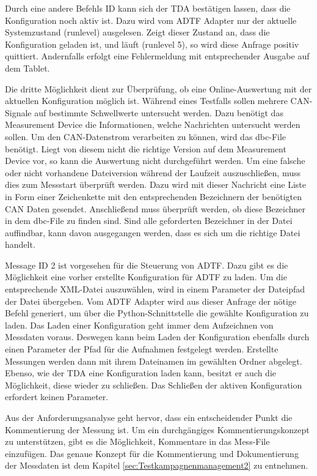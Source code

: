 \documentclass[12pt,a4paper]{report}
\begin{document}
Durch eine andere Befehls ID kann sich der TDA bestätigen lassen, dass die Konfiguration noch aktiv ist. Dazu wird vom ADTF Adapter nur der aktuelle Systemzustand (runlevel) ausgelesen. Zeigt dieser Zustand an, dass die Konfiguration geladen ist, und läuft (runlevel 5), so wird diese Anfrage positiv quittiert. Andernfalls erfolgt eine Fehlermeldung mit entsprechender Ausgabe auf dem Tablet.

Die dritte Möglichkeit dient zur Überprüfung, ob eine Online-Auswertung mit der aktuellen Konfiguration möglich ist. Während eines Testfalls sollen mehrere CAN-Signale auf bestimmte Schwellwerte untersucht werden. Dazu benötigt das Measurement Device die Informationen, welche Nachrichten untersucht werden sollen. Um den CAN-Datenstrom verarbeiten zu können, wird das dbc-File benötigt. Liegt von diesem nicht die richtige Version auf dem Measurement Device vor, so kann die Auswertung nicht durchgeführt werden. Um eine falsche oder nicht vorhandene Dateiversion während der Laufzeit auszuschließen, muss dies zum Messstart überprüft werden. Dazu wird mit dieser Nachricht eine Liste in Form einer Zeichenkette mit den entsprechenden Bezeichnern der benötigten CAN Daten gesendet. Anschließend muss überprüft werden, ob diese Bezeichner in dem dbc-File zu finden sind. Sind alle geforderten Bezeichner in der Datei auffindbar, kann davon ausgegangen werden, dass es sich um die richtige Datei handelt.

Message ID 2 ist vorgesehen für die Steuerung von ADTF. Dazu gibt es die Möglichkeit eine vorher erstellte Konfiguration für ADTF zu laden. Um die entsprechende XML-Datei auszuwählen, wird in einem Parameter der Dateipfad der Datei übergeben. Vom ADTF Adapter wird aus dieser Anfrage der nötige Befehl generiert, um über die Python-Schnittstelle die gewählte Konfiguration zu laden. Das Laden einer Konfiguration geht immer dem Aufzeichnen von Messdaten voraus. Deswegen kann beim Laden der Konfiguration ebenfalls durch einen Parameter der Pfad für die Aufnahmen festgelegt werden. Erstellte Messungen werden dann mit ihrem Dateinamen im gewählten Ordner abgelegt. Ebenso, wie der TDA eine Konfiguration laden kann, besitzt er auch die Möglichkeit, diese wieder zu schließen. Das Schließen der aktiven Konfiguration erfordert keinen Parameter.

Aus der Anforderungsanalyse geht hervor, dass ein entscheidender Punkt die Kommentierung der Messung ist. Um ein durchgängiges Kommentierungskonzept zu unterstützen, gibt es die Möglichkeit, Kommentare in das Mess-File einzufügen. Das genaue Konzept für die Kommentierung und Dokumentierung der Messdaten ist dem Kapitel \ref{sec:Testkampagnenmanagement2} zu entnehmen.
\end{document}
